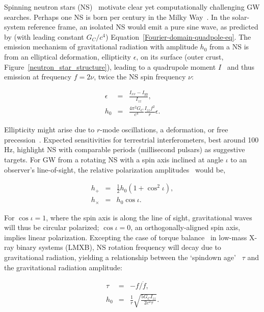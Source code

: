 Spinning neutron stars (NS)~\cite{Prix2006} motivate clear yet computationally challenging GW searches.
Perhaps one NS is born per century in the Milky Way~\cite{NarayanOstriker1990}.
In the solar-system reference frame, an isolated NS would emit a pure sine wave, as predicted by (with leading constant $G_C/c^4$) Equation~\ref{Fourier-domain-quadpole-eq}.
        The emission mechanism of gravitational radiation with amplitude $h_0$ from a NS is from an elliptical deformation, ellipticity $\epsilon$, on its surface (outer crust, Figure~\ref{neutron_star_structure}), leading to a quadrupole moment $I$~\cite{Zimmermann1979,LSCPulsar2006} and thus emission at frequency $f = 2\nu$, twice the NS spin frequency $\nu$:

        \begin{eqnarray}
        \epsilon &=& \frac{I_{xx} - I_{yy}}{I_{zz}}, \\
        h_0 &=& \frac{4 \pi^2 G_C}{c^4} \frac{I_{zz} f^2}{r} \epsilon.
        \end{eqnarray}

Ellipticity might arise due to $r$-mode oscillations, a deformation, or free precession~\cite{Shawhan2010}.
Expected sensitivities for terrestrial interferometers, best around 100 Hz, highlight NS with comparable periods (millisecond pulsars) as suggestive targets.
For GW from a rotating NS with a spin axis inclined at angle $\iota$ to an observer's line-of-sight, the relative polarization amplitudes~\cite{DergachevThesis} would be,

\begin{eqnarray} 
h_+ &=& \tfrac{1}{2} h_0 (1 + \cos^2 \iota),\\
h_\times &=& h_0 \cos \iota.
\end{eqnarray}

For $\cos \iota = 1$, where the spin axis is along the line of sight, gravitational waves will thus be circular polarized; $\cos \iota = 0$, an orthogonally-aligned spin axis, implies linear polarization.
Excepting the case of torque balance~\cite{PapaloizouPringle1978,Wagoner1984} in low-mass X-ray binary systems (LMXB), NS rotation frequency will decay due to gravitational radiation, yielding a relationship between the `spindown age'~\cite{Brady1998} $\tau$ and the gravitational radiation amplitude:

        \begin{eqnarray}
        \tau &=& -f / \dot{f}, \\
        h_0 &=& \frac{1}{r} \sqrt{\frac{5 G_C I_{zz}}{2 c^2 \tau}}.
        \end{eqnarray}

